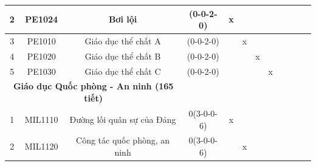 \documentclass[12pt,a4paper]{report}
\begin{document}
\begin{landscape}
\begin{longtable}[c]{|c|c|c|c|c|c|c|c|c|c|c|c|}
        2                             & PE1024                          & Bơi lội                                                      & (0-0-2-0)                                                                            & x           &             &             &             &             &             &             &             \\ \hline
        3                             & PE1010                          & Giáo dục thể chất A                                          & (0-0-2-0)                                                                            &             & x           &             &             &             &             &             &             \\ \hline
        4                             & PE1020                          & Giáo dục thể chất B                                          & (0-0-2-0)                                                                            &             &             & x           &             &             &             &             &             \\ \hline
        5                             & PE1030                          & Giáo dục thể chất C                                          & (0-0-2-0)                                                                            &             &             &             & x           &             &             &             &             \\ \hline
        \multicolumn{3}{|c|}{\textbf{Giáo dục Quốc phòng - An ninh (165 tiết)}}                                                        &                                                                                      &             &             &             &             &             &             &             &             \\ \hline
        1                             & MIL1110                         & Đường lối quân sự của Đảng                                   & 0(3-0-0-6)                                                                           & x           &             &             &             &             &             &             &             \\ \hline
        2                             & MIL1120                         & Công tác quốc phòng, an ninh                                 & 0(3-0-0-6)                                                                           &             & x           &             &             &             &             &             &             \\ \hline

\end{longtable}
\end{landscape}
\end{document}
